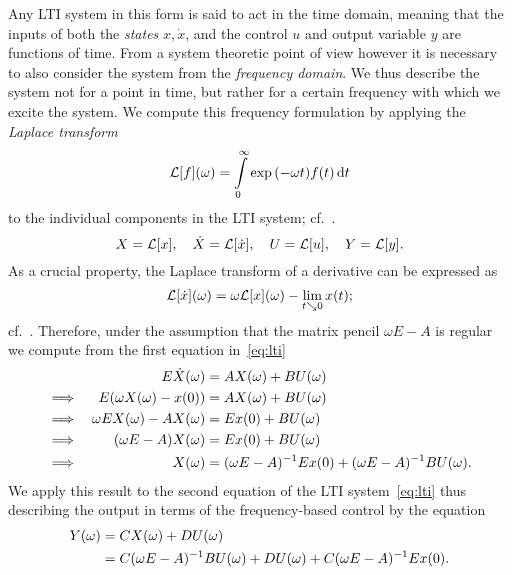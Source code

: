 Any LTI system in this form is said to act in the time domain, meaning that the inputs of both the \emph{states} $x, \dot{x}$, and the control $u$ and output variable $y$ are functions of time.
From a system theoretic point of view however it is necessary to also consider the system from the \emph{frequency domain}.
We thus describe the system not for a point in time, but rather for a certain frequency with which we excite the system.
We compute this frequency formulation by applying the \emph{Laplace transform}
\begin{equation*}\label{eq:laplace-trafo}
    \mathcal{L}[f](\omega) = \int\limits_0^\infty \exp{(- \omega t)} f(t) \mathop{}\!\mathrm{d} t
\end{equation*}
to the individual components in the LTI system; cf.~\cite{Arendt2011}.
\begin{equation}
    X = \mathcal{L}[x],\quad \dot{X} = \mathcal{L}[\dot{x}],\quad U = \mathcal{L}[u],\quad Y = \mathcal{L}[y].
\end{equation}
As a crucial property, the Laplace transform of a derivative can be expressed as
\begin{equation*}
    \mathcal{L}[\dot{x}](\omega) = \omega \mathcal{L}[x](\omega) - \lim\limits_{t \searrow 0} x(t);
\end{equation*}
cf.~\cite[Theorem~9.1]{Doetsch1974}.
Therefore, under the assumption that the matrix pencil $\omega E - A$ is regular we compute from the first equation in~\eqref{eq:lti}
\begin{alignat*}{3}
     & & E \dot{X}(\omega) &= A X(\omega) + B U(\omega) \\
    \implies & & E (\omega X(\omega) - x(0)) &= A X(\omega) + B U(\omega) \\
    \implies & & \omega E X(\omega) - A X(\omega) &= E x(0) + B U(\omega) \\
    \implies & & (\omega E - A) X(\omega) &= E x(0) + B U(\omega) \\
    \implies & & X(\omega) &= (\omega E - A)^{-1} E x(0) + (\omega E - A)^{-1} B U(\omega).
\end{alignat*}
We apply this result to the second equation of the LTI system~\eqref{eq:lti} thus describing the output in terms of the frequency-based control by the equation
\begin{equation}\label{eq:frequency-output}
    \begin{aligned}
        Y(\omega) &= C X(\omega) + D U(\omega) \\
        &= C (\omega E - A)^{-1} B U(\omega) + D U(\omega) + C (\omega E - A)^{-1} E x(0).
    \end{aligned}
\end{equation}
